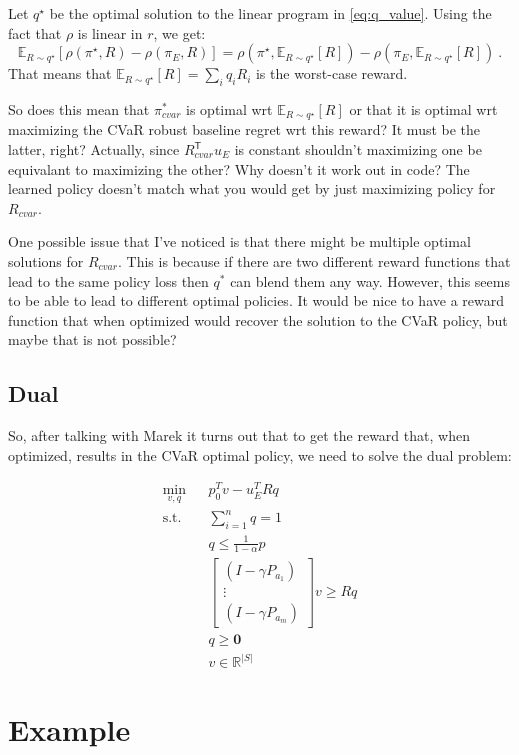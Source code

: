 \documentclass{article}
\newcommand{\tr}{^\mathsf{T}}
\newcommand{\Ex}{\mathbb{E}}
\newcommand{\zero}{\mathbf{0}}
\newcommand{\opt}{^{\star}}
\begin{document}
Let $q\opt$ be the optimal solution to the linear program in \eqref{eq:q_value}. Using the fact that $\rho$ is linear in $r$, we get:
\[ \Ex_{R \sim q\opt} \left[ \rho(\pi\opt, R) - \rho(\pi_E, R) \right] =  \rho\left(\pi\opt, \Ex_{R \sim q\opt}[R]\right) - \rho\left(\pi_E, \Ex_{R \sim q\opt}[R]\right)~.\]
That means that $\Ex_{R \sim q\opt}[R] = \sum_i q_i R_i$ is the worst-case reward.

So does this mean that $\pi^*_{cvar}$ is optimal wrt $\Ex_{R \sim q\opt}[R]$ or that it is optimal wrt maximizing the CVaR robust baseline regret wrt this reward? It must be the latter, right? Actually, since $R_{cvar}\tr u_E$ is constant shouldn't maximizing one be equivalant to maximizing the other? Why doesn't it work out in code? The learned policy doesn't match what you would get by just maximizing policy for $R_{cvar}$. 

One possible issue that I've noticed is that there might be multiple optimal solutions for $R_{cvar}$. This is because if there are two different reward functions that lead to the same policy loss then $q^*$ can blend them any way. However, this seems to be able to lead to different optimal policies. It would be nice to have a reward function that when optimized would recover the solution to the CVaR policy, but maybe that is not possible?

\subsection{Dual}

So, after talking with Marek it turns out that to get the reward that, when optimized, results in the CVaR optimal policy, we need to solve the dual problem:

\begin{eqnarray}
\min_{v, q}&& p_0^T v - u_E^T R q\\
\text{s.t.}&& \sum_{i=1}^n q = 1 \\
&& q \leq \frac{1}{1-\alpha}p\\
&&\begin{bmatrix}
(I - \gamma P_{a_1})\\
\vdots \\
(I - \gamma P_{a_m})
\end{bmatrix}
v \geq Rq\\
&& q \geq \zero \\
&& v \in \mathbb{R}^{|S|}
\end{eqnarray}	

\section{Example}
\end{document}
